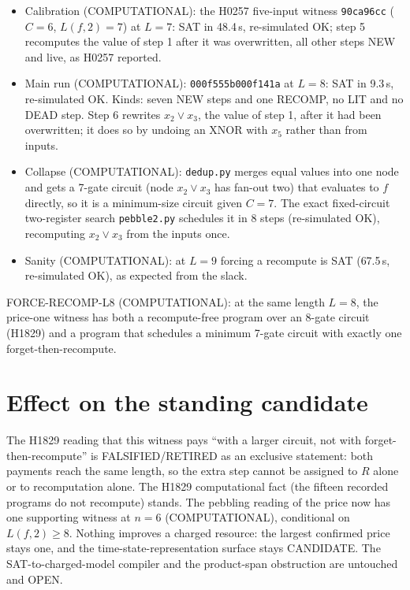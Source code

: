 \documentclass[11pt]{article}
\begin{document}
\begin{itemize}
\item Calibration (COMPUTATIONAL): the H0257 five-input witness \texttt{90ca96cc} ($C=6$, $L(f,2)=7$) at $L=7$: SAT in 48.4\,s, re-simulated OK; step 5 recomputes the value of step 1 after it was overwritten, all other steps NEW and live, as H0257 reported.
\item Main run (COMPUTATIONAL): \texttt{000f555b000f141a} at $L=8$: SAT in 9.3\,s, re-simulated OK. Kinds: seven NEW steps and one RECOMP, no LIT and no DEAD step. Step 6 rewrites $x_2\lor x_3$, the value of step 1, after it had been overwritten; it does so by undoing an XNOR with $x_5$ rather than from inputs.
\item Collapse (COMPUTATIONAL): \texttt{dedup.py} merges equal values into one node and gets a 7-gate circuit (node $x_2\lor x_3$ has fan-out two) that evaluates to $f$ directly, so it is a minimum-size circuit given $C=7$. The exact fixed-circuit two-register search \texttt{pebble2.py} schedules it in 8 steps (re-simulated OK), recomputing $x_2\lor x_3$ from the inputs once.
\item Sanity (COMPUTATIONAL): at $L=9$ forcing a recompute is SAT (67.5\,s, re-simulated OK), as expected from the slack.
\end{itemize}

FORCE-RECOMP-L8 (COMPUTATIONAL): at the same length $L=8$, the price-one witness has both a recompute-free program over an 8-gate circuit (H1829) and a program that schedules a minimum 7-gate circuit with exactly one forget-then-recompute.

\section*{Effect on the standing candidate}
The H1829 reading that this witness pays ``with a larger circuit, not with forget-then-recompute'' is FALSIFIED/RETIRED as an exclusive statement: both payments reach the same length, so the extra step cannot be assigned to $R$ alone or to recomputation alone. The H1829 computational fact (the fifteen recorded programs do not recompute) stands. The pebbling reading of the price now has one supporting witness at $n=6$ (COMPUTATIONAL), conditional on $L(f,2)\ge 8$. Nothing improves a charged resource: the largest confirmed price stays one, and the time-state-representation surface stays CANDIDATE. The SAT-to-charged-model compiler and the product-span obstruction are untouched and OPEN.
\end{document}
